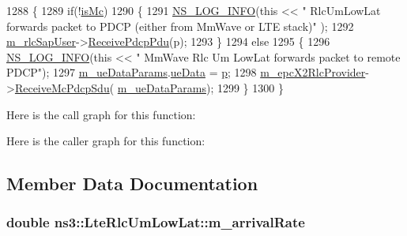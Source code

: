\begin{DoxyCode}
1288 \{
1289   \textcolor{keywordflow}{if}(!\hyperlink{classns3_1_1LteRlc_a63b29f59aa944b3eaba8d8f156fba4c2}{isMc}) 
1290   \{
1291     \hyperlink{group__logging_gafbd73ee2cf9f26b319f49086d8e860fb}{NS\_LOG\_INFO}(\textcolor{keyword}{this} << \textcolor{stringliteral}{" RlcUmLowLat forwards packet to PDCP (either from MmWave or LTE stack)"}
      );
1292     \hyperlink{classns3_1_1LteRlc_a0156774a917567c2cee1f353d56dfffa}{m\_rlcSapUser}->\hyperlink{classns3_1_1LteRlcSapUser_aaadbd52044f4bf26453b6eb2e26df9c8}{ReceivePdcpPdu}(p);
1293   \}
1294   \textcolor{keywordflow}{else}
1295   \{
1296     \hyperlink{group__logging_gafbd73ee2cf9f26b319f49086d8e860fb}{NS\_LOG\_INFO}(\textcolor{keyword}{this} << \textcolor{stringliteral}{" MmWave Rlc Um LowLat forwards packet to remote PDCP"});
1297     \hyperlink{classns3_1_1LteRlc_a6f4d5d0a7f8d3dd3c35a5fc0598ea3b8}{m\_ueDataParams}.\hyperlink{structns3_1_1EpcX2Sap_1_1UeDataParams_aa194f663de494c1bf03bd42e51b81a8e}{ueData} = \hyperlink{lte__link__budget_8m_ac9de518908a968428863f829398a4e62}{p};
1298     \hyperlink{classns3_1_1LteRlc_aa997bbf2807b79443887abd57facd1c8}{m\_epcX2RlcProvider}->\hyperlink{classns3_1_1EpcX2RlcProvider_ae58a8184e3a1b3243f328b8d0efe3352}{ReceiveMcPdcpSdu}(
      \hyperlink{classns3_1_1LteRlc_a6f4d5d0a7f8d3dd3c35a5fc0598ea3b8}{m\_ueDataParams});
1299   \}
1300 \}
\end{DoxyCode}


Here is the call graph for this function\+:




Here is the caller graph for this function\+:




\subsection{Member Data Documentation}
\subsubsection[{\texorpdfstring{m\+\_\+arrival\+Rate}{m_arrivalRate}}]{\setlength{\rightskip}{0pt plus 5cm}double ns3\+::\+Lte\+Rlc\+Um\+Low\+Lat\+::m\+\_\+arrival\+Rate\hspace{0.3cm}{\ttfamily [private]}}\hypertarget{classns3_1_1LteRlcUmLowLat_af21ae9a7045300d4a4c48da973e5f697}{}\label{classns3_1_1LteRlcUmLowLat_af21ae9a7045300d4a4c48da973e5f697}
